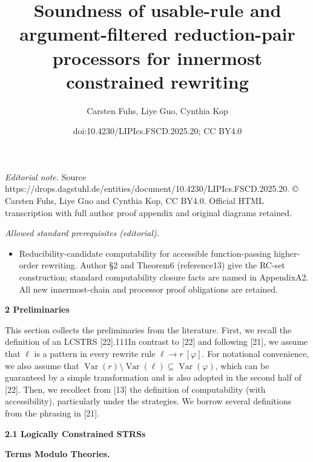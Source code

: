 \documentclass[10pt,a4paper]{amsart}
\title{Soundness of usable-rule and argument-filtered reduction-pair processors for innermost constrained rewriting}
\author{Carsten Fuhs, Liye Guo, Cynthia Kop}
\date{doi:10.4230/LIPIcs.FSCD.2025.20; CC BY4.0}
\begin{document}
\maketitle
\noindent\textit{Editorial note.} Source https://drops.dagstuhl.de/entities/document/10.4230/LIPIcs.FSCD.2025.20. © Carsten Fuhs, Liye Guo and Cynthia Kop, CC BY4.0. Official HTML transcription with full author proof appendix and original diagrams retained.\par\medskip
\noindent\textit{Allowed standard prerequisites (editorial).}\begin{itemize}
\item Reducibility-candidate computability for accessible function-passing higher-order rewriting. Author §2 and Theorem6 (reference13) give the RC-set construction; standard computability closure facts are named in AppendixA2. All new innermost-chain and processor proof obligations are retained.
\end{itemize}\medskip
 
\par\medskip\noindent\textbf{2 Preliminaries}\par
 
 
This section collects the preliminaries from the literature. First, we recall the definition of an LCSTRS [22].111In contrast to [22] and following [21], we assume that $\ell$ is a pattern in every rewrite rule ${\ell}\rightarrow{r}\ [\varphi]$. For notational convenience, we also assume that $\operatorname{Var}(r)\setminus\operatorname{Var}(\ell)\subseteq\operatorname{Var}(\varphi)$, which can be guaranteed by a simple transformation and is also adopted in the second half of [22]. Then, we recollect from [13] the definition of computability (with accessibility), particularly under the strategies. We borrow several definitions from the phrasing in [21].\par
 
 
 
\par\medskip\noindent\textbf{2.1 Logically Constrained STRSs}\par
 
 
\par\medskip\noindent\textbf{Terms Modulo Theories.}\par
 
 
\end{document}
